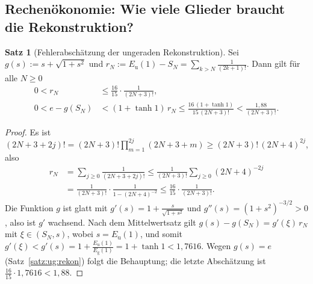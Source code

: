 \documentclass[a4paper,12pt,twoside]{report}
\theoremstyle{definition}
\newtheorem{satz}{Satz}
\begin{document}
\subsection{Rechenökonomie: Wie viele Glieder braucht die Rekonstruktion?}
\label{sec:ug:rechnen}

\begin{satz}[Fehlerabschätzung der ungeraden Rekonstruktion]\label{satz:ug:fehler}
Sei $g(s):=s+\sqrt{1+s^2}$ und $r_N:=E_{\mathrm u}(1)-S_N=\sum_{k>N}\frac1{(2k+1)!}$. Dann gilt für alle $N\ge0$
\begin{align*}
0<r_N&\le\frac{16}{15}\cdot\frac1{(2N+3)!},\\
0<e-g(S_N)&<(1+\tanh 1)\,r_N\le\frac{16\,(1+\tanh1)}{15\,(2N+3)!}<\frac{1{,}88}{(2N+3)!}.
\end{align*}
\end{satz}

\begin{proof}
Es ist $(2N+3+2j)!=(2N+3)!\prod_{m=1}^{2j}(2N+3+m)\ge(2N+3)!\,(2N+4)^{2j}$, also
\begin{align*}
r_N&=\sum_{j\ge0}\frac1{(2N+3+2j)!}\le\frac1{(2N+3)!}\sum_{j\ge0}(2N+4)^{-2j}\\
&=\frac{1}{(2N+3)!}\cdot\frac1{1-(2N+4)^{-2}}\le\frac{16}{15}\cdot\frac1{(2N+3)!}.
\end{align*}
Die Funktion $g$ ist glatt mit $g'(s)=1+\frac s{\sqrt{1+s^2}}$ und $g''(s)=(1+s^2)^{-3/2}>0$, also ist $g'$ wachsend. Nach dem Mittelwertsatz gilt $g(s)-g(S_N)=g'(\xi)\,r_N$ mit $\xi\in(S_N,s)$, wobei $s=E_{\mathrm u}(1)$, und somit $g'(\xi)<g'(s)=1+\frac{E_{\mathrm u}(1)}{E_{\mathrm g}(1)}=1+\tanh1<1{,}7616$. Wegen $g(s)=e$ (Satz~\ref{satz:ug:rekon}) folgt die Behauptung; die letzte Abschätzung ist $\tfrac{16}{15}\cdot1{,}7616<1{,}88$.
\end{proof}
\end{document}
